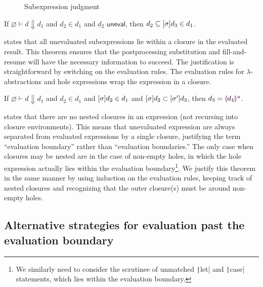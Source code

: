 \begin{figure}
  \centering
  \begin{mdframed}
    \begin{singlespace}
      
    \end{singlespace}
  \end{mdframed}
  \caption{Subexpression judgment}
  \label{fig:subexpression}
\end{figure}

\begin{theorem}
  If $\varnothing\vdash d\Downarrow d_1$ and $d_2\in d_1$ and $d_2\textsf{ uneval}$, then $d_2\subseteq[\sigma]d_3\in d_1$.
  \label{thm:eval-boundary-1}
\end{theorem}

 states that all unevaluated subexpressions lie within a closure in the evaluated result. This theorem ensures that the postprocessing substitution and fill-and-resume will have the necessary information to succeed. The justification is straightforward by switching on the evaluation rules. The evaluation rules for $\lambda$-abstractions and hole expressions wrap the expression in a closure.

\begin{theorem}
  If $\varnothing\vdash d\Downarrow d_1$ and $d_2\in d_1$ and $[\sigma]d_2\in d_1$ and $[\sigma]d_2\subset[\sigma']d_3$, then $d_3=\textcolor{violet}{\llparenthesis} d_4\textcolor{violet}{\rrparenthesis}^u$.
  \label{thm:eval-boundary-2}
\end{theorem}

 states that there are no nested closures in an expression (not recursing into closure environments). This means that unevaluated expression are always separated from evaluated expressions by a single closure, justifying the term ``evaluation boundary'' rather than ``evaluation boundaries.'' The only case when closures may be nested are in the case of non-empty holes, in which the hole expression actually lies within the evaluation boundary\footnote{We similarly need to consider the scrutinee of unmatched \texttt|let| and \texttt|case| statements, which lies within the evaluation boundary.}. We justify this theorem in the same manner by using induction on the evaluation rules, keeping track of nested closures and recognizing that the outer closure(s) must be around non-empty holes.

\subsection{Alternative strategies for evaluation past the \\ evaluation boundary}
\label{sec:alt_strat_unevaluated}

